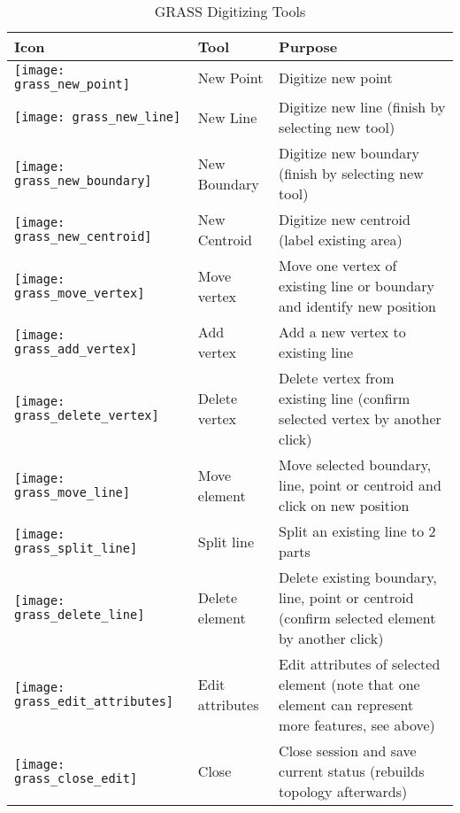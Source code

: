\begin{table}[h]
\centering
\caption{GRASS Digitizing Tools}\label{tab:grass_tools}\medskip
 \begin{tabular}{|l|l|p{5in}|}
 \hline \textbf{Icon} & \textbf{Tool} & \textbf{Purpose} \\
\hline \texttt{[image: grass\_new\_point]} & New Point & Digitize
new point \\
\hline \texttt{[image: grass\_new\_line]} & New Line & Digitize
new line (finish by selecting new tool) \\
\hline \texttt{[image: grass\_new\_boundary]} & New Boundary &
Digitize new boundary (finish by selecting new tool)\\
\hline \texttt{[image: grass\_new\_centroid]} & New Centroid &
Digitize new centroid (label existing area)\\
\hline \texttt{[image: grass\_move\_vertex]} & Move vertex & Move
one vertex of existing line or boundary and identify new position\\
\hline \texttt{[image: grass\_add\_vertex]} & Add vertex & Add a
new vertex to existing line\\
\hline \texttt{[image: grass\_delete\_vertex]} & Delete vertex &
Delete vertex from existing line (confirm selected vertex by another click)\\
\hline \texttt{[image: grass\_move\_line]} & Move element & Move
selected boundary, line, point or centroid and click on new position\\
\hline \texttt{[image: grass\_split\_line]} & Split line & Split
an existing line to 2 parts\\
\hline \texttt{[image: grass\_delete\_line]} & Delete element &
Delete existing boundary, line, point or centroid (confirm selected element by
another click)\\
\hline \texttt{[image: grass\_edit\_attributes]} & Edit attributes
& Edit attributes of selected element (note that one element can represent
more features, see above)\\
\hline \texttt{[image: grass\_close\_edit]} & Close & Close
session and save current status (rebuilds topology afterwards)\\
\hline
\end{tabular}
\end{table}


